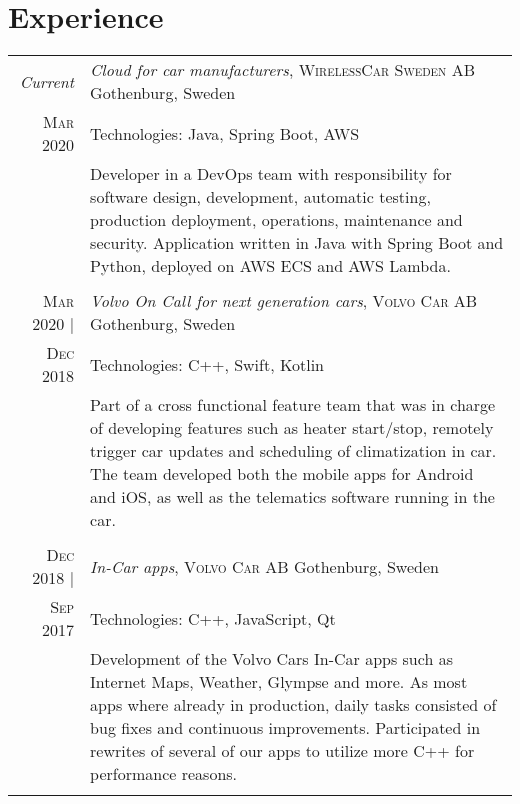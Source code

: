 \documentclass[a4paper,10pt]{scrartcl} %
\begin{document}
\section{Experience}
\begin{tabular}{r|p{15cm}}


\emph{Current} 	                    & \emph{Cloud for car manufacturers}, \textsc{WirelessCar Sweden AB} \hfill Gothenburg, Sweden \\
\textsc{Mar 2020}                   & \footnotesize{Technologies: Java, Spring Boot, AWS} \\
\phantom{abcdefghijklm}             & \footnotesize{Developer in a DevOps team with responsibility for software design, development, automatic testing, production deployment, operations, maintenance and security. Application written in Java with Spring Boot and Python, deployed on AWS ECS and AWS Lambda.} \\
\multicolumn{2}{c}{} \\


\textsc{Mar 2020} |	                & \emph{Volvo On Call for next generation cars}, \textsc{Volvo Car AB} \hfill Gothenburg, Sweden \\
\textsc{Dec 2018}                   & \footnotesize{Technologies: C++, Swift, Kotlin} \\
\phantom{abcdefghijklm}             & \footnotesize{
Part of a cross functional feature team that was in charge of developing features such as heater start/stop, remotely trigger car updates and scheduling of climatization in car. The team developed both the mobile apps for Android and iOS, as well as the telematics software running in the car. } \\
\multicolumn{2}{c}{} \\


\textsc{Dec 2018} | 	            & \emph{In-Car apps}, \textsc{Volvo Car AB} \hfill Gothenburg, Sweden \\
\textsc{Sep 2017}                   & \footnotesize{Technologies: C++, JavaScript, Qt} \\
\phantom{abcdefghijklm}             & \footnotesize{
Development of the Volvo Cars In-Car apps such as Internet Maps, Weather, Glympse and more. As most apps where already in production, daily tasks consisted of bug fixes and continuous improvements. Participated in rewrites of several of our apps to utilize more C++ for performance reasons. } \\
\multicolumn{2}{c}{} \\


\end{tabular}
\end{document}
